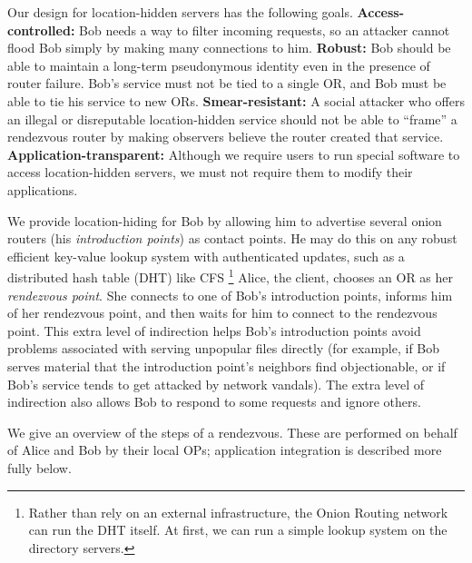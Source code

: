 \documentclass[times,10pt,twocolumn]{article}
\begin{document}
Our design for location-hidden servers has the following goals.
\textbf{Access-controlled:} Bob needs a way to filter incoming requests,
so an attacker cannot flood Bob simply by making many connections to him.
\textbf{Robust:} Bob should be able to maintain a long-term pseudonymous
identity even in the presence of router failure. Bob's service must
not be tied to a single OR, and Bob must be able to tie his service
to new ORs. \textbf{Smear-resistant:}
A social attacker who offers an illegal or disreputable location-hidden
service should not be able to ``frame'' a rendezvous router by 
making observers believe the router created that service.
\textbf{Application-transparent:} Although we require users
to run special software to access location-hidden servers, we must not
require them to modify their applications.

We provide location-hiding for Bob by allowing him to advertise
several onion routers (his \emph{introduction points}) as contact
points. He may do this on any robust efficient
key-value lookup system with authenticated updates, such as a
distributed hash table (DHT) like CFS \cite{cfs:sosp01}\footnote{
Rather than rely on an external infrastructure, the Onion Routing network
can run the DHT itself.  At first, we can run a simple lookup
system on the
directory servers.} Alice, the client, chooses an OR as her
\emph{rendezvous point}. She connects to one of Bob's introduction
points, informs him of her rendezvous point, and then waits for him
to connect to the rendezvous point. This extra level of indirection
helps Bob's introduction points avoid problems associated with serving
unpopular files directly (for example, if Bob serves
material that the introduction point's neighbors find objectionable,
or if Bob's service tends to get attacked by network vandals).
The extra level of indirection also allows Bob to respond to some requests
and ignore others.

We give an overview of the steps of a rendezvous. These are
performed on behalf of Alice and Bob by their local OPs;
application integration is described more fully below.
\end{document}
